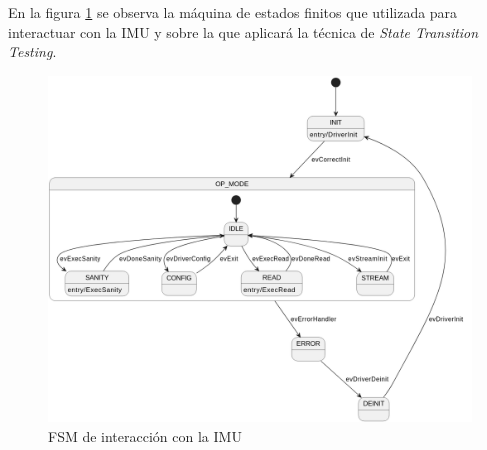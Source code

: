 \documentclass[
11pt, %
codirector, %
]{simple_charter}
\begin{document}
En la figura \ref{fig:fsm-de-interaccion-con-la-imu} se observa la máquina de estados finitos
que utilizada para interactuar con la IMU y sobre la que aplicará la técnica de \textit{State
Transition Testing}.

\begin{figure}[H]
\centering
\includegraphics[width=\textwidth]{imgs/imu_bridge_fsm.png}
\caption{FSM de interacción con la IMU}
\label{fig:fsm-de-interaccion-con-la-imu}
\end{figure}
\end{document}
